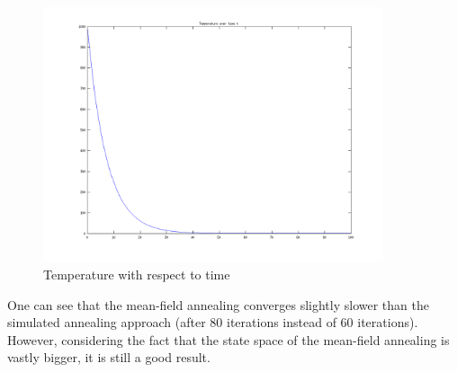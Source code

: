 \documentclass{article}
\begin{document}
		\begin{figure}[H]
			\includegraphics[width=10cm]{temperature2.png}
			\caption{Temperature with respect to time}
		\end{figure}
		
		One can see that the mean-field annealing converges slightly slower than the simulated annealing approach (after 80 iterations instead of 60 iterations). However, considering the fact that the state space of the mean-field annealing is vastly bigger, it is still a good result.
			
	
\end{document}
